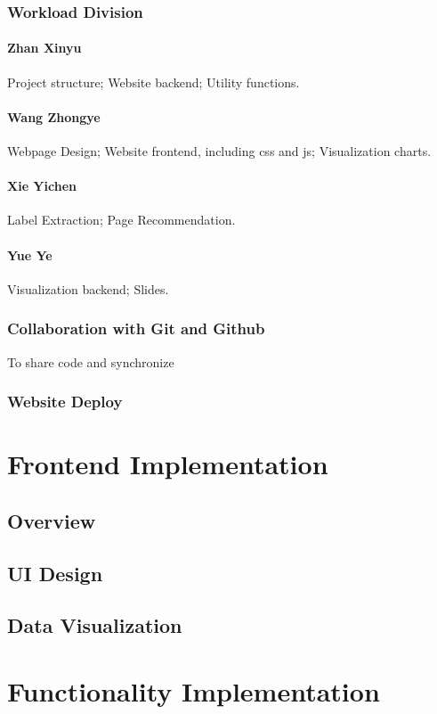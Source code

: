 \documentclass[a4paper, 10pt]{article}
\begin{document}
\subsubsection{Workload Division}
\paragraph{Zhan Xinyu} Project structure; Website backend; Utility functions.
\paragraph{Wang Zhongye} Webpage Design; Website frontend, including css and js; Visualization charts.
\paragraph{Xie Yichen} Label Extraction; Page Recommendation. 
\paragraph{Yue Ye} Visualization backend; Slides.
\subsubsection{Collaboration with Git and Github}
To share code and synchronize 
\subsubsection{Website Deploy}
\section{Frontend Implementation}
\subsection{Overview}
\subsection{UI Design}
\subsection{Data Visualization}
\section{Functionality Implementation}
\end{document}
